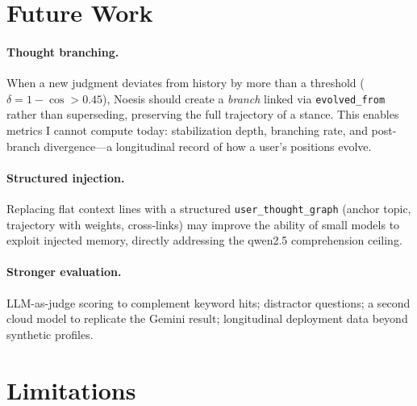 \documentclass[11pt]{article}
\begin{document}
\section{Future Work}
\label{sec:future}

\paragraph{Thought branching.} When a new judgment deviates from history by
more than a threshold ($\delta = 1-\cos > 0.45$), Noesis should create a
\emph{branch} linked via \texttt{evolved\_from} rather than superseding,
preserving the full trajectory of a stance. This enables metrics I cannot
compute today: stabilization depth, branching rate, and post-branch
divergence---a longitudinal record of how a user's positions evolve.

\paragraph{Structured injection.} Replacing flat context lines with a
structured \texttt{user\_thought\_graph} (anchor topic, trajectory with
weights, cross-links) may improve the ability of small models to exploit
injected memory, directly addressing the qwen2.5 comprehension ceiling.

\paragraph{Stronger evaluation.} LLM-as-judge scoring to complement keyword
hits; distractor questions; a second cloud model to replicate the Gemini
result; longitudinal deployment data beyond synthetic profiles.

\section{Limitations}
\label{sec:limitations}
\end{document}
